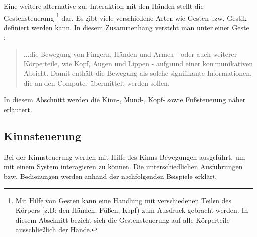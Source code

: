 Eine weitere alternative zur Interaktion mit den Händen stellt die Gestensteuerung%
\footnote{Mit Hilfe von Gesten kann eine Handlung mit verschiedenen Teilen des Körpers (z.B: den Händen, Füßen, Kopf) zum Ausdruck gebracht werden. In diesem Abschnitt bezieht sich die Gestensteuerung auf alle Körperteile ausschließlich der Hände.} %
dar. Es gibt viele verschiedene Arten wie Gesten bzw. Gestik definiert werden kann. In diesem Zusammenhang versteht man unter einer Geste \cite{PreimDachselt}:
\begin{quote} ...die Bewegung von Fingern, Händen und Armen - oder auch weiterer Körperteile, wie Kopf, Augen und Lippen - aufgrund einer kommunikativen Absicht. Damit enthält die Bewegung als solche signifikante Informationen, die an den Computer übermittelt werden sollen. \end{quote}
In diesem Abschnitt werden die Kinn-, Mund-, Kopf- sowie Fußsteuerung näher erläutert. 


\subsection{Kinnsteuerung}

Bei der Kinnsteuerung werden mit Hilfe des Kinns Bewegungen ausgeführt, um mit einem System interagieren zu können. Die unterschiedlichen Ausführungen bzw. Bedienungen werden anhand der nachfolgenden Beispiele erklärt.

